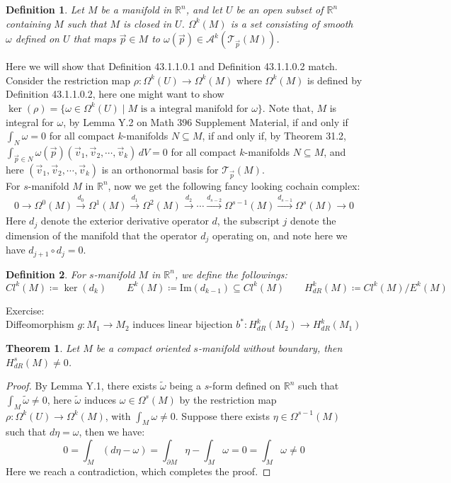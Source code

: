 \documentclass[15pt]{book}
\theoremstyle{break}
\theoremstyle{break}
\newtheorem{thm}{Theorem}[section]
\newtheorem{defn}{Definition}[corL]
\newcommand{\R}{\mathbb{R}}
\newcommand{\T}{\mathcal{T}}
\newcommand{\A}{\mathcal{A}}
\newcommand{\that}[1]{\widetilde{#1}}
\newcommand{\txtarrow}[1]{\xrightarrow{\text{#1}}}
\newcommand{\exercise}{\color{green}Exercise: \color{black}}
\begin{document}
\begin{defn}
Let $M$ be a manifold in $\R^n$, and let $U$ be an open subset of $\R^n$ containing $M$ such that $M$ is closed in $U$. $\Omega^k(M)$ is a set consisting of smooth $\omega$ defined on $U$ that maps $\vec{p}\in M$ to $\omega(\vec{p}) \in \A^k(\T_{\vec{p}}(M))$.
\end{defn}

Here we will show that Definition 43.1.1.0.1 and Definition 43.1.1.0.2 match. Consider the restriction map $\rho:\Omega^k(U)\to \Omega^k(M)$ where $ \Omega^k(M)$ is defined by Definition 43.1.1.0.2, here one might want to show $\ker(\rho) = \{ \omega \in \Omega^k(U) \mid M \text{ is a integral manifold for }\omega\}$. Note that, $M$ is integral for $\omega$, by Lemma Y.2 on Math 396 Supplement Material, if and only if $\int_N \omega  = 0$ for all compact $k$-manifolds $N\subseteq M$, if and only if, by Theorem 31.2, $\int_{\vec{p}\in N}\omega (\vec{p}) ( \vec{v}_1,\vec{v}_2,\cdots,  \vec{v}_k)\,dV = 0$ for all compact $k$-manifolds $N\subseteq M$, and here $(\vec{v}_1,\vec{v}_2,\cdots, \vec{v}_k)$ is an orthonormal basis for $\T_{\vec{p}}(M)$.\\


For $s$-manifold $M$ in $\R^n$, now we get the following fancy looking cochain complex:
\begin{align*}
0 \to \Omega^0(M) \txtarrow{$d_0$}  \Omega^1 (M) \txtarrow{$d_1$} \Omega^2(M)\txtarrow{$d_2$} \cdots \txtarrow{$d_{s-2}$} \Omega^{s-1}(M) \txtarrow{$d_{s-1}$} \Omega^s(M) \to 0
\end{align*}
Here $d_j$ denote the exterior derivative operator $d$, the subscript $j$ denote the dimension of the manifold that the operator $d_j$ operating on, and note here we have $d_{j+1}\circ d_j = 0$.\\
\begin{defn}
For $s$-manifold $M$ in $\R^n$, we define the followings:
$$Cl^k(M) \coloneqq \ker(d_k)
 \qquad 
E^k(M) \coloneqq \text{Im}(d_{k-1}) \subseteq Cl^k(M)
 \qquad 
H^k_{dR}(M) \coloneqq Cl^k(M) / E^k(M)$$
\end{defn}
\exercise\\ 
Diffeomorphism $g:M_1 \to M_2$ induces linear bijection $b^*:H_{dR}^k(M_2) \to H_{dR}^k(M_1)$

\begin{thm}
Let $M$ be a compact oriented $s$-manifold without boundary, then $H_{dR}^s(M) \neq 0$. 
\end{thm}
\begin{proof}
By Lemma Y.1, there exists $\that{\omega}$ being a $s$-form defined on $\R^n$ such that $\int_M \that{\omega}\neq 0$, here $\that{\omega}$ induces $\omega \in \Omega^s(M)$ by the restriction map $\rho :\Omega^k(U)\to \Omega^k(M)$, with $\int_M \omega \neq 0$. 
Suppose there exists $\eta \in \Omega^{s-1}(M)$ such that $d\eta = \omega$, then we have:
$$0 =\int_M (d\eta - \omega) = \int_{\partial M}\eta - \int_M \omega = 0 =\int_M \omega  \neq 0$$
Here we reach a contradiction, which completes the proof.
\end{proof}
\end{document}
